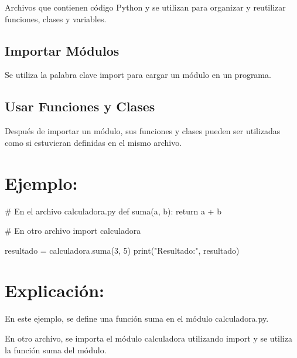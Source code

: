 \documentclass[
  a4paper,
  onepage,
  openany]{scrreprt}
\newenvironment{Shaded}{\begin{snugshade}}{\end{snugshade}}
\newcommand{\BuiltInTok}[1]{\textcolor[rgb]{0.00,0.23,0.31}{#1}}
\newcommand{\CommentTok}[1]{\textcolor[rgb]{0.37,0.37,0.37}{#1}}
\newcommand{\ControlFlowTok}[1]{\textcolor[rgb]{0.00,0.23,0.31}{#1}}
\newcommand{\DecValTok}[1]{\textcolor[rgb]{0.68,0.00,0.00}{#1}}
\newcommand{\ImportTok}[1]{\textcolor[rgb]{0.00,0.46,0.62}{#1}}
\newcommand{\KeywordTok}[1]{\textcolor[rgb]{0.00,0.23,0.31}{#1}}
\newcommand{\NormalTok}[1]{\textcolor[rgb]{0.00,0.23,0.31}{#1}}
\newcommand{\OperatorTok}[1]{\textcolor[rgb]{0.37,0.37,0.37}{#1}}
\newcommand{\StringTok}[1]{\textcolor[rgb]{0.13,0.47,0.30}{#1}}
\begin{document}
Archivos que contienen código Python y se utilizan para organizar y
reutilizar funciones, clases y variables.

\hypertarget{importar-muxf3dulos}{%
\subsection{Importar Módulos}\label{importar-muxf3dulos}}

Se utiliza la palabra clave import para cargar un módulo en un programa.

\hypertarget{usar-funciones-y-clases}{%
\subsection{Usar Funciones y Clases}\label{usar-funciones-y-clases}}

Después de importar un módulo, sus funciones y clases pueden ser
utilizadas como si estuvieran definidas en el mismo archivo.

\hypertarget{ejemplo-58}{%
\section{Ejemplo:}\label{ejemplo-58}}

\begin{Shaded}
\begin{Highlighting}[]
\CommentTok{\# En el archivo calculadora.py}
\KeywordTok{def}\NormalTok{ suma(a, b):}
    \ControlFlowTok{return}\NormalTok{ a }\OperatorTok{+}\NormalTok{ b}

\CommentTok{\# En otro archivo}
\ImportTok{import}\NormalTok{ calculadora}

\NormalTok{resultado }\OperatorTok{=}\NormalTok{ calculadora.suma(}\DecValTok{3}\NormalTok{, }\DecValTok{5}\NormalTok{)}
\BuiltInTok{print}\NormalTok{(}\StringTok{"Resultado:"}\NormalTok{, resultado)}
\end{Highlighting}
\end{Shaded}

\hypertarget{explicaciuxf3n-58}{%
\section{Explicación:}\label{explicaciuxf3n-58}}

En este ejemplo, se define una función suma en el módulo calculadora.py.

En otro archivo, se importa el módulo calculadora utilizando import y se
utiliza la función suma del módulo.
\end{document}
